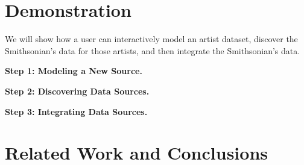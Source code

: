 \documentclass[runningheads,a4paper]{llncs}
\begin{document}
\section{Demonstration}
We will show how a user can interactively model an artist dataset, discover the Smithsonian's data for those artists, and then integrate the Smithsonian's data.  

\textbf{Step 1: Modeling a New Source.} 


\textbf{Step 2: Discovering Data Sources.} 


\textbf{Step 3: Integrating Data Sources.} 

\section{Related Work and Conclusions} 



\vspace{-1mm}


\end{document}

